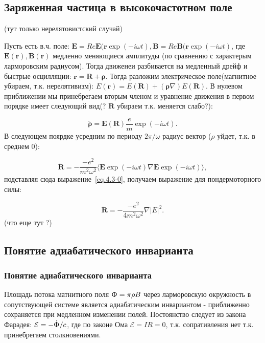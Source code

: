 \documentclass[10pt, a4paper]{article}
\numberwithin{equation}{section}
\begin{document}
\subsection{Заряженная частица в высокочастотном поле}
\label{sec.4.3}
(тут только нерелятовистский случай)

Пусть есть в.ч. поле: $\mathbf{E}=Re\mathbf{E}(\mathbf{r}\exp(-i\omega t), \mathbf{B}=Re\mathbf{B}(\mathbf{r}\exp(-i\omega t)$, где $\mathbf{E}(\mathbf{r}), \mathbf{B}(\mathbf{r})$ медленно меняющиеся амплитуды (по сравнению с характерым
ларморовским радиусом). Тогда движенеи разбивается на медленный дрейф и быстрые осцилляции: $\mathbf{r}=\mathbf{R}+\mathbf{\rho}$. 
Тогда разложим электрическое поле(магнитное убираем, т.к. нерелятивизм): $E(\mathbf{r})=E(\mathbf{R})+(\mathbf{\rho} \nabla)E(\mathbf{R})$. В нулевом приближении мы принебрегаем вторым членом и уравнение движения в первом порядке имеет 
следующий вид(? $\mathbf{R}$ убираем т.к. меняется слабо?):

\begin{equation}
    \label{eq.4.3-0}
    \ddot{\mathbf{\rho}}=\mathbf{E}(\mathbf{R}) \frac{e}{m} \exp(-i\omega t).
\end{equation}
В следующем поярдке усредним по периоду $2\pi/\omega$ радиус вектор ($\rho$ уйдет, т.к. в среднем 0):

\begin{equation}
    \label{eq.4.3-1}
    \ddot{\mathbf{R}}=-\frac{-e^2}{m^2 \omega^2}\langle \mathbf{E} \exp(-i\omega t) \nabla \mathbf{E} \exp(-i\omega t) \rangle, 
\end{equation}
подставляя сюда выражение~\ref{eq.4.3-0}, получаем выражение для пондермоторного силы:

\begin{equation}
    \label{eq.4.3pf}
    \ddot{\mathbf{R}}=-\frac{-e^2}{4 m^2 \omega^2} \nabla |E|^2.
\end{equation}
(что еще тут ?)

\subsection{Понятие адиабатического инварианта}
\label{sec.4.4}

\subsubsection{Понятие адиабатического инварианта}
\label{sec.4.4.1}
Площадь потока матнитного поля $\Upphi=\pi \rho B$ через ларморовскую окружность в сопутствующей системе является
адиабатическим инвариантом - приближенно сохраняется при медленном изменении полей. Постоянство следует из закона
Фарадея: $\mathcal{E}=-\dot{\Upphi}/c$, где по законе Ома $\mathcal{E}=IR=0$, т.к. сопративления нет т.к. принебрегаем
столкновениями.
\end{document}
